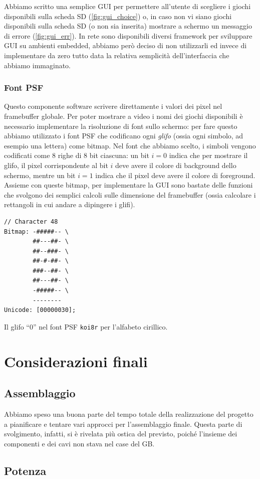 \documentclass[hidelinks,12pt]{article}
\begin{document}
Abbiamo scritto una semplice GUI per permettere all'utente di scegliere i giochi
disponibili sulla scheda SD (\cref{fig:gui_choice}) o, in caso non vi siano
giochi disponibili sulla scheda SD (o non sia inserita) mostrare a schermo un
messaggio di errore (\cref{fig:gui_err}).
In rete sono disponibili diversi framework per sviluppare GUI su ambienti
embedded, abbiamo però deciso di non utilizzarli ed invece di implementare
da zero tutto data la relativa semplicità dell'interfaccia che abbiamo immaginato.

\subsubsection{Font PSF}
Questo componente software scrivere direttamente i valori dei pixel nel
framebuffer globale. Per poter mostrare a video i nomi dei giochi disponibili è
necessario implementare la risoluzione di font sullo schermo: per fare questo
abbiamo utilizzato i font PSF che codificano ogni \textit{glifo} (ossia ogni
simbolo, ad esempio una lettera) come bitmap. Nel font che abbiamo scelto, i
simboli vengono codificati come $8$ righe di $8$ bit ciascuna: un bit $i = 0$
indica che per mostrare il glifo, il pixel corrispondente al bit $i$ deve avere
il colore di background dello schermo, mentre un bit $i = 1$ indica che il pixel
deve avere il colore di foreground. Assieme con queste bitmap, per implementare
la GUI sono bastate delle funzioni che svolgono dei  semplici calcoli sulle
dimensione del framebuffer (ossia calcolare i rettangoli in cui andare a
dipingere i glifi). 
\begin{table}[h]
  \begin{verbatim}
// Character 48
Bitmap: -#####-- \
        ##---##- \
        ##--###- \
        ##-#-##- \
        ###--##- \
        ##---##- \
        -#####-- \
        --------
Unicode: [00000030];
  \end{verbatim}
  \caption{Il glifo ``0'' nel font PSF \texttt{koi8r} per l'alfabeto cirillico.}
\end{table}

\section{Considerazioni finali}
\subsection{Assemblaggio}
Abbiamo speso una buona parte del tempo totale della realizzazione del progetto
a pianificare e tentare vari approcci per l'assemblaggio finale. Questa parte di
svolgimento, infatti, si è rivelata più ostica del previsto, poiché l'insieme
dei componenti e dei cavi non stava nel case del GB. 

\subsection{Potenza}




\addcontentsline{toc}{section}{References}
\nocite{*}
\printbibliography
\end{document}
